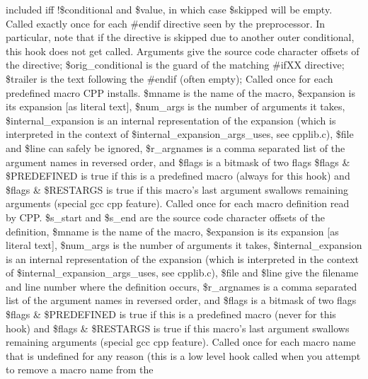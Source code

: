 included iff !\$conditional and \$value, in which case \$skipped will be empty.
Called exactly once for each \#endif directive seen by the preprocessor. In particular,
note that if the directive is skipped due to another outer conditional, this
hook does not get called.
Arguments give the source code character
offsets of the directive; \$orig\_\-conditional is the guard of the matching
\#ifXX directive; \$trailer is the text following the \#endif (often empty);
Called once for each predefined macro CPP installs.
\$mname is the name of the macro, \$expansion is its expansion [as literal text], 
\$num\_\-args is the number of arguments it takes, \$internal\_\-expansion is an
internal representation of the expansion (which is interpreted in the 
context of \$internal\_\-expansion\_\-args\_\-uses, see cpplib.c), \$file and \$line
can safely be ignored, \$r\_\-argnames is a comma separated list of the
argument names in reversed order, and \$flags is a bitmask of two flags
\$flags \& \$PREDEFINED is true if this is a predefined macro (always for this hook)
and \$flags \& \$RESTARGS is true if this macro's last argument swallows 
remaining arguments (special gcc cpp feature).
Called once for each macro definition read by  CPP.
\$s\_\-start and \$s\_\-end are the source code character offsets of the definition,
\$mname is the name of the macro, \$expansion is its expansion [as literal text], 
\$num\_\-args is the number of arguments it takes, \$internal\_\-expansion is an
internal representation of the expansion (which is interpreted in the 
context of \$internal\_\-expansion\_\-args\_\-uses, see cpplib.c), \$file and \$line
give the filename and line number where the definition occurs, 
\$r\_\-argnames is a comma separated list of the
argument names in reversed order, and \$flags is a bitmask of two flags
\$flags \& \$PREDEFINED is true if this is a predefined macro (never for this hook)
and \$flags \& \$RESTARGS is true if this macro's last argument swallows 
remaining arguments (special gcc cpp feature).
Called once for each macro name that is undefined for any reason (this is
a low level hook called when you attempt to remove a macro name from the 

